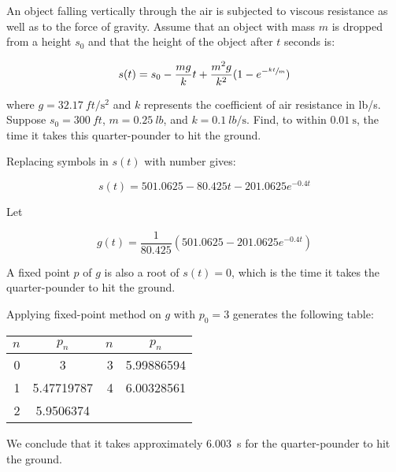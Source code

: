 \documentclass[../../../../Assignments]{subfiles}
\begin{document}
\begin{exercise}
    An object falling vertically through the air is subjected to viscous
    resistance as well as to the force of gravity. Assume that an object with
    mass \(m\) is dropped from a height \(s_0\) and that the height of the
    object after \(t\) seconds is:

    \[s(t) = s_0 - \frac{mg}{k} t + \frac{m^2g}{k^2} (1 - e^{- \sfrac{kt}{m}})\]

    \noindent where \(g = \qty{32.17}{ft \per \second \squared}\) and \(k\)
    represents the coefficient of air resistance in lb/s. Suppose \(s_0 =
    \qty{300}{ft}\), \(m = \qty{0.25}{lb}\), and \(k = \qty{0.1}{lb \per
    \second}\). Find, to within \(\qty{0.01}{\second}\), the time it takes this
    quarter-pounder to hit the ground.
\end{exercise}

\begin{solution}
    Replacing symbols in \(s(t)\) with number gives:

    \[s(t) = \num{501.0625} - \num{80.425} t - \num{201.0625} e^{\num{-0.4} t}\]

    Let

    \[g(t) = \frac{1}{80.425} (501.0625 - \num{201.0625} e^{\num{-0.4} t})\]

    A fixed point \(p\) of \(g\) is also a root of \(s(t) = 0\), which is the
    time it takes the quarter-pounder to hit the ground.

    Applying fixed-point method on \(g\) with \(p_0 = 3\) generates the
    following table:

    \begin{table}[H]
        \centering
        \begin{tabular}{r S[table-format=1.8] r S[table-format=1.8]}
            \toprule
            \(n\)  &   {\(p_n\)}   &  \(n\)  &   {\(p_n\)}   \\
              &  3            &      3  &  5.99886594   \\
                1  &  5.47719787   &      4  &  6.00328561   \\
                2  &  5.9506374    &         &               \\
            \bottomrule
        \end{tabular}
    \end{table}

    We conclude that it takes approximately \qty{6.003}{\second} for the
    quarter-pounder to hit the ground.
\end{solution}
\end{document}
